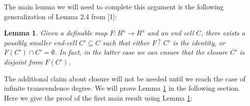\documentclass{article}
\newtheorem{lemma}[theorem]{Lemma}
\theoremstyle{remark}
\theoremstyle{definition}
\theoremstyle{definition}
\theoremstyle{definition}
\theoremstyle{definition}
\begin{document}
The main lemma we will need to complete this argument is the following generalization of Lemma 2.4 from [1]:

\begin{lemma}\label{MainLemma} Given a definable map $F:R^n\to R^n$ and an end cell $C$, there exists a possibly smaller end-cell $C'\subseteq C$ such that either $F\upharpoonright C'$ is the identity, or $F(C')\cap C'=\emptyset$. In fact, in the latter case we can ensure that the closure $\overline{C'}$ is disjoint from $F(C')$.
\end{lemma}

The additional claim about closure will not be needed until we reach the case of infinite transcendence degree. We will prove Lemma \ref{MainLemma} in the following section. Here we give the proof of the first main result using Lemma \ref{MainLemma}:
\end{document}
